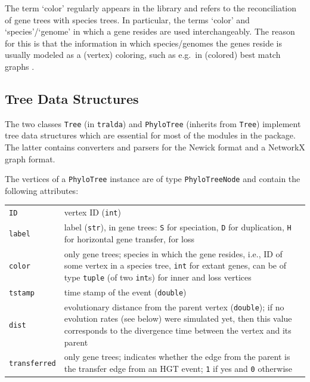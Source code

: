 \documentclass[hidelinks,11pt]{article}
\newcommand{\sq}{\textquotesingle}
\begin{document}
The term `color' regularly appears in the library and refers to the reconciliation of gene trees with species trees.
In particular, the terms `color' and `species'/`genome' in which a gene resides are used interchangeably.
The reason for this is that the information in which species/genomes the genes 
reside is usually modeled as a (vertex) coloring, such as e.g.\ in (colored) 
best match graphs \citep{geiss2019a}.



\subsection{Tree Data Structures}

The two classes \texttt{Tree} (in \texttt{tralda}) and \texttt{PhyloTree} 
(inherits from \texttt{Tree}) implement tree data structures which are 
essential for most of the modules in the package.
The latter contains converters and parsers for the Newick format and a NetworkX graph format.

The vertices of a \texttt{PhyloTree} instance are of type \texttt{PhyloTreeNode} and contain the following attributes:

\vspace{3mm}
\renewcommand{\arraystretch}{1.5}

{\small\centering
\begin{longtable}{ p{3.0cm} p{10cm} }
	\texttt{ID} & vertex ID (\texttt{int})\\
	\texttt{label}  & label (\texttt{str}), in gene trees: \texttt{\sq S\sq} for
	speciation, \texttt{\sq D\sq} for duplication, \texttt{\sq H\sq} for
	horizontal gene transfer, \texttt{\sq *\sq} for loss\\
	\texttt{color} & only gene trees; species in which the gene resides, i.e., ID of some vertex in a species tree, \texttt{int} for extant genes, can be of type \texttt{tuple} (of two \texttt{int}s) for inner and loss vertices\\
	\texttt{tstamp} & time stamp of the event (\texttt{double})\\
	\texttt{dist} & evolutionary distance from the parent vertex 
	(\texttt{double}); if no evolution rates (see below) were simulated yet, then 
	this value corresponds to the divergence time between the vertex and its 
	parent\\
	\texttt{transferred} & only gene trees; indicates whether the edge from the 
	parent is the transfer edge from an HGT event; \texttt{1} if yes and 
	\texttt{0} otherwise \\
\end{longtable}
}
\vspace{3mm}
\end{document}
